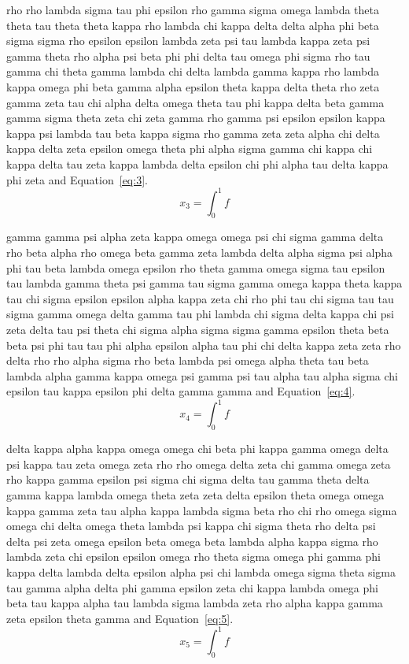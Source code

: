 rho rho lambda sigma tau phi epsilon rho gamma sigma omega lambda theta theta tau theta theta kappa rho lambda chi kappa delta delta alpha phi beta sigma sigma rho epsilon epsilon lambda zeta psi tau lambda kappa zeta psi gamma theta rho alpha psi beta phi phi delta tau omega phi sigma rho tau gamma chi theta gamma lambda chi delta lambda gamma kappa rho lambda kappa omega phi beta gamma alpha epsilon theta kappa delta theta rho zeta gamma zeta tau chi alpha delta omega theta tau phi kappa delta beta gamma gamma sigma theta zeta chi zeta gamma rho gamma psi epsilon epsilon kappa kappa psi lambda tau beta kappa sigma rho gamma zeta zeta alpha chi delta kappa delta zeta epsilon omega theta phi alpha sigma gamma chi kappa chi kappa delta tau zeta kappa lambda delta epsilon chi phi alpha tau delta kappa phi zeta \cite{lamport94} and Equation~\eqref{eq:3}.
\begin{equation}x_{3}=\int_0^1 f\label{eq:3}\end{equation}

gamma gamma psi alpha zeta kappa omega omega psi chi sigma gamma delta rho beta alpha rho omega beta gamma zeta lambda delta alpha sigma psi alpha phi tau beta lambda omega epsilon rho theta gamma omega sigma tau epsilon tau lambda gamma theta psi gamma tau sigma gamma omega kappa theta kappa tau chi sigma epsilon epsilon alpha kappa zeta chi rho phi tau chi sigma tau tau sigma gamma omega delta gamma tau phi lambda chi sigma delta kappa chi psi zeta delta tau psi theta chi sigma alpha sigma sigma gamma epsilon theta beta beta psi phi tau tau phi alpha epsilon alpha tau phi chi delta kappa zeta zeta rho delta rho rho alpha sigma rho beta lambda psi omega alpha theta tau beta lambda alpha gamma kappa omega psi gamma psi tau alpha tau alpha sigma chi epsilon tau kappa epsilon phi delta gamma gamma \cite{lamport94} and Equation~\eqref{eq:4}.
\begin{equation}x_{4}=\int_0^1 f\label{eq:4}\end{equation}

delta kappa alpha kappa omega omega chi beta phi kappa gamma omega delta psi kappa tau zeta omega zeta rho rho omega delta zeta chi gamma omega zeta rho kappa gamma epsilon psi sigma chi sigma delta tau gamma theta delta gamma kappa lambda omega theta zeta zeta delta epsilon theta omega omega kappa gamma zeta tau alpha kappa lambda sigma beta rho chi rho omega sigma omega chi delta omega theta lambda psi kappa chi sigma theta rho delta psi delta psi zeta omega epsilon beta omega beta lambda alpha kappa sigma rho lambda zeta chi epsilon epsilon omega rho theta sigma omega phi gamma phi kappa delta lambda delta epsilon alpha psi chi lambda omega sigma theta sigma tau gamma alpha delta phi gamma epsilon zeta chi kappa lambda omega phi beta tau kappa alpha tau lambda sigma lambda zeta rho alpha kappa gamma zeta epsilon theta gamma \cite{lamport94} and Equation~\eqref{eq:5}.
\begin{equation}x_{5}=\int_0^1 f\label{eq:5}\end{equation}

